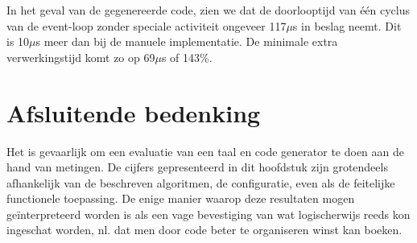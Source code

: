 In het geval van de gegenereerde code, zien we dat de doorlooptijd van \'e\'en
cyclus van de event-loop zonder speciale activiteit ongeveer 117$\mu$s in
beslag neemt. Dit is 10$\mu$s meer dan bij de manuele implementatie. De
minimale extra verwerkingstijd komt zo op 69$\mu$s of 143\%.

\section{Afsluitende bedenking}

Het is gevaarlijk om een evaluatie van een taal en code generator te doen aan
de hand van metingen. De cijfers gepresenteerd in dit hoofdstuk zijn
grotendeels afhankelijk van de beschreven algoritmen, de configuratie, even als
de feitelijke functionele toepassing. De enige manier waarop deze resultaten
mogen ge\"interpreteerd worden is als een vage bevestiging van wat
logischerwijs reeds kon ingeschat worden, nl. dat men door code beter te
organiseren winst kan boeken.